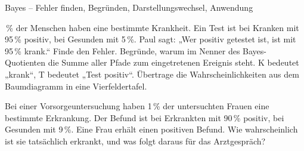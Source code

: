 \begin{aufgabe}{Bayes – Fehler finden, Begründen, Darstellungswechsel, Anwendung}
\begin{teile}
\,\% der Menschen haben eine bestimmte Krankheit. Ein Test ist bei Kranken mit 95\,\% positiv, bei Gesunden mit 5\,\%. Paul sagt: „Wer positiv getestet ist, ist mit 95\,\% krank.“ Finde den Fehler.
\teil Begründe, warum im Nenner des Bayes-Quotienten die Summe aller Pfade zum eingetretenen Ereignis steht.
\teil K bedeutet „krank“, T bedeutet „Test positiv“. Übertrage die Wahrscheinlichkeiten aus dem Baumdiagramm in eine Vierfeldertafel.

\teil Bei einer Vorsorgeuntersuchung haben 1\,\% der untersuchten Frauen eine bestimmte Erkrankung. Der Befund ist bei Erkrankten mit 90\,\% positiv, bei Gesunden mit 9\,\%. Eine Frau erhält einen positiven Befund. Wie wahrscheinlich ist sie tatsächlich erkrankt, und was folgt daraus für das Arztgespräch?
\end{teile}
\end{aufgabe}
